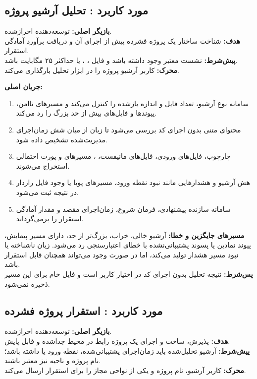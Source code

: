 \UseCaseStart
\subsection{مورد کاربرد : تحلیل آرشیو پروژه}
\noindent\textbf{بازیگر اصلی:} توسعه‌دهنده احرازشده.\\
\textbf{هدف:} شناخت ساختار یک پروژه فشرده پیش از اجرای آن و دریافت برآورد آمادگی استقرار.\\
\textbf{پیش‌شرط:} نشست معتبر وجود داشته باشد و فایل ، ،  یا  حداکثر ۲۵ مگابایت باشد.\\
\textbf{محرک:} کاربر آرشیو پروژه را در ابزار تحلیل بارگذاری می‌کند.


\noindent\textbf{جریان اصلی:}
\begin{enumerate}
  \item سامانه نوع آرشیو، تعداد فایل و اندازه بازشده را کنترل می‌کند و مسیرهای ناامن، پیوندها و فایل‌های بیش از حد بزرگ را رد می‌کند.
  \item محتوای متنی بدون اجرای کد بررسی می‌شود تا زبان از میان شش زمان‌اجرای مدیریت‌شده تشخیص داده شود.
  \item چارچوب، فایل‌های ورودی، فایل‌های مانیفست، ، مسیرهای  و پورت احتمالی استخراج می‌شوند.
  \item هش آرشیو و هشدارهایی مانند نبود نقطه ورود، مسیرهای پویا یا وجود فایل رازدار در نتیجه ثبت می‌شود.
  \item سامانه سازنده پیشنهادی، فرمان شروع، زمان‌اجرای مقصد و مقدار آمادگی استقرار را برمی‌گرداند.
\end{enumerate}

\noindent\textbf{مسیرهای جایگزین و خطا:}
آرشیو خالی، خراب، بزرگ‌تر از حد، دارای مسیر پیمایش، پیوند نمادین یا پسوند پشتیبانی‌نشده با خطای اعتبارسنجی رد می‌شود. زبان ناشناخته یا نبود مسیر  هشدار تولید می‌کند، اما در صورت وجود  می‌تواند همچنان قابل استقرار باشد.\\
\textbf{پس‌شرط:} نتیجه تحلیل بدون اجرای کد در اختیار کاربر است و فایل خام برای این مسیر ذخیره نمی‌شود.

\UseCaseStart
\subsection{مورد کاربرد : استقرار پروژه فشرده}
\noindent\textbf{بازیگر اصلی:} توسعه‌دهنده احرازشده.\\
\textbf{هدف:} پذیرش، ساخت و اجرای یک پروژه رابط در محیط جداشده و قابل پایش.\\
\textbf{پیش‌شرط:} آرشیو تحلیل‌شده باید زمان‌اجرای پشتیبانی‌شده، نقطه ورود یا  داشته باشد؛ نام پروژه و ناحیه نیز معتبر باشند.\\
\textbf{محرک:} کاربر آرشیو، نام پروژه و یکی از نواحی مجاز را برای استقرار ارسال می‌کند.

